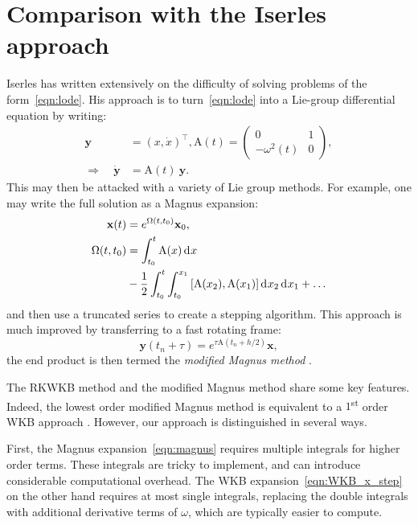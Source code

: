 \section{Comparison with the Iserles approach}
\label{sec:iserles_comparison}
Iserles has written extensively on the difficulty of solving problems of the form~\eqref{eqn:lode}. His approach is to turn~\eqref{eqn:lode} into a Lie-group differential equation \citep{Iserles00lie-groupmethods} by writing:
\begin{align}
  \mathbf{y} &= {(x,\dot{x})}^\top, 
  \mathrm{A}(t) = 
  \left(
  \begin{array}{cc}
    0 & 1 \\
    -\omega^2(t) & 0
  \end{array}
  \right),
  \nonumber\\
  \Rightarrow\quad 
  \dot{\mathbf{y}} &= \mathrm{A} (t) \: \mathbf{y}.\label{eqn:lie_eqn}
\end{align}
This may then be attacked with a variety of Lie group methods. For example, one may write the full solution as a Magnus expansion:
\begin{align}
  \mathbf{x}(t) &= e^{\Omega(t,t_0)} \mathbf{x}_0,
  \label{eqn:magnus}\\
  \Omega(t,t_0) &= \int_{t_0}^t \mathrm{A}(x) \operatorname{d}^{}\!{x} \nonumber \\
  &- \frac{1}{2}\int_{t_0}^t\int_{t_0}^{x_1} \left[\mathrm{A}(x_2),\mathrm{A}(x_1)\right] \operatorname{d}^{}\!{x_2} \operatorname{d}^{}\!{x_1} + \ldots
  \nonumber
\end{align}
and then use a truncated series to create a stepping algorithm.
This approach is much improved by transferring to a fast rotating frame:
\begin{equation}
  \mathbf{y}(t_n+\tau) = e^{\tau \mathrm{A}(t_n+h/2)} \mathbf{x},
  \label{eqn:rotating_frame}
\end{equation}
the end product is then termed the {\em modified Magnus method\/} \citep{Iserles01thinkglobally}.

The RKWKB method and the modified Magnus method share some key features. Indeed, the lowest order modified Magnus method is equivalent to a \(1\)\textsuperscript{st} order WKB approach \citep{Iserles02globalerror}. However, our approach is distinguished in several ways. 

First, the Magnus expansion~\eqref{eqn:magnus} requires multiple integrals for higher order terms. These integrals are tricky to implement, and can introduce considerable computational overhead. The WKB expansion~\eqref{eqn:WKB_x_step} on the other hand requires at most single integrals, replacing the double integrals with additional derivative terms of \(\omega\), which are typically easier to compute.

